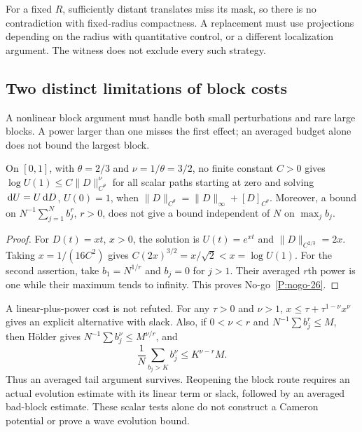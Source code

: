

For a fixed $R$, sufficiently distant translates miss its mask, so there is
no contradiction with fixed-radius compactness. A replacement must use
projections depending on the radius with quantitative control, or a different
localization argument. The witness does not exclude every such strategy.

\subsection{Two distinct limitations of block costs}
\label{S:nogo-26}

A nonlinear block argument must handle both small perturbations and rare large
blocks. A power larger than one misses the first effect; an averaged budget
alone does not bound the largest block.

\setcounter{nogo}{25}
\begin{nogo}
  \label{P:nogo-26}
  On $[0,1]$, with $\theta=2/3$ and $\nu=1/\theta=3/2$, no finite constant
  $C>0$ gives
  $\log U(1)\le C\|D\|_{C^\theta}^{\nu}$ for all scalar paths starting at zero
  and solving $\,\mathrm{d} U=U\,\mathrm{d} D$, $U(0)=1$, when
  $\|D\|_{C^\theta}=\|D\|_\infty+[D]_{C^\theta}$.
  Moreover, a bound on $N^{-1}\sum_{j=1}^N b_j^r$, $r>0$, does not give a
  bound independent of $N$ on $\max_j b_j$.
\end{nogo}
\begin{proof}
  For $D(t)=xt$, $x>0$, the solution is $U(t)=e^{xt}$ and
  $\|D\|_{C^{2/3}}=2x$. Taking $x=1/(16C^2)$ gives
  $C(2x)^{3/2}=x/\sqrt2<x=\log U(1)$.
  For the second assertion, take $b_1=N^{1/r}$ and $b_j=0$ for $j>1$.
  Their averaged $r$th power is one while their maximum tends to infinity.
  This proves No-go~\ref{P:nogo-26}.
\end{proof}

A linear-plus-power cost is not refuted. For any $\tau>0$ and $\nu>1$,
$x\le\tau+\tau^{1-\nu}x^\nu$ gives an explicit alternative with slack.
Also, if $0<\nu<r$ and $N^{-1}\sum b_j^r\le M$, then H\"older gives
$N^{-1}\sum b_j^\nu\le M^{\nu/r}$, and
\[
  \frac1N\sum_{b_j>K}b_j^\nu\le K^{\nu-r}M.
\]
Thus an averaged tail argument survives. Reopening the block route requires
an actual evolution estimate with its linear term or slack, followed by an
averaged bad-block estimate. These scalar tests alone do not construct a
Cameron potential or prove a wave evolution bound.

